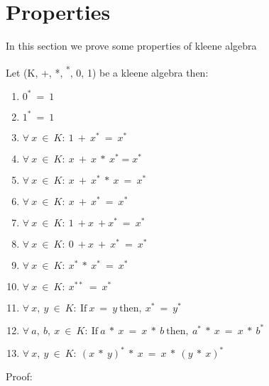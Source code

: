 \section{Properties}
In this section we prove some properties of kleene algebra

Let (K, +, *, \textsuperscript{*}, 0, 1) be a kleene algebra then:
\begin{enumerate}
\item $0^{*}\ =\ 1$
\item $1^{*}\ =\ 1$
\item $\forall \ x\ \in\ K:\ 1\ +\ x^{*}\ =\ x^{*}$
\item $\forall \ x\ \in\ K:\ x\ +\ x\ *\ x^{*} = x^{*}$
\item $\forall \ x\ \in\ K:\ x\ +\ x^{*}\ *\ x\ =\ x^{*}$
\item $\forall \ x\ \in\ K:\ x\ +\ x^{*}\ =\ x^{*}$
\item $\forall \ x\ \in\ K:\ 1\ + x\ + x^{*}\ =\ x^{*}$
\item $\forall \ x\ \in\ K:\ 0\ + x\ +\ x^{*}\ =\ x^{*}$
\item $\forall \ x\ \in\ K:\ x^{*}\ *\ x^{*}\ =\ x^{*}$
\item $\forall \ x\ \in\ K:\ x^{**}\ =\ x^{*}$
\item $\forall\ x,\ y\ \in\ K:\ \text{If}\ x\ =\ y\ \text{then},\ x^{*}\ =\ y^{*}$
\item $\forall\ a,\ b,\ x\ \in\ K:\ \text{If}\ a\ *\ x\ =\ x\ *\ b\ \text{then},\ a^{*}\ *\ x\ =\ x\ *\ b^{*}$
\item $\forall\ x,\ y\ \in\ K:\ (x\ *\ y)^{*}\ *\ x\ =\ x\ *\ (y\ *\ x)^{*}$
\end{enumerate}
Proof:
